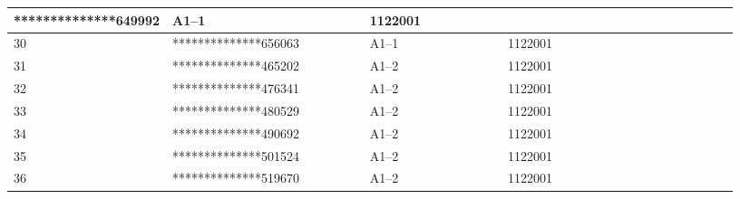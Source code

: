 \documentclass[UTF8,10pt,a4paper,fontset=fandol]{ctexart}
\newcommand{\fieldvalue}[1]{#1}
\begin{document}
\begin{tabular}{|p{0.10\linewidth}|p{0.29\linewidth}|p{0.20\linewidth}|p{0.22\linewidth}|p{0.12\linewidth}|}
\fieldvalue{**************649992}
&
\fieldvalue{A1--1}
&
\fieldvalue{1122001}
&\\
\hline
30 &
\fieldvalue{**************656063}
&
\fieldvalue{A1--1}
&
\fieldvalue{1122001}
&\\
\hline
31 &
\fieldvalue{**************465202}
&
\fieldvalue{A1--2}
&
\fieldvalue{1122001}
&\\
\hline
32 &
\fieldvalue{**************476341}
&
\fieldvalue{A1--2}
&
\fieldvalue{1122001}
&\\
\hline
33 &
\fieldvalue{**************480529}
&
\fieldvalue{A1--2}
&
\fieldvalue{1122001}
&\\
\hline
34 &
\fieldvalue{**************490692}
&
\fieldvalue{A1--2}
&
\fieldvalue{1122001}
&\\
\hline
35 &
\fieldvalue{**************501524}
&
\fieldvalue{A1--2}
&
\fieldvalue{1122001}
&\\
\hline
36 &
\fieldvalue{**************519670}
&
\fieldvalue{A1--2}
&
\fieldvalue{1122001}

\end{tabular}
\end{document}
